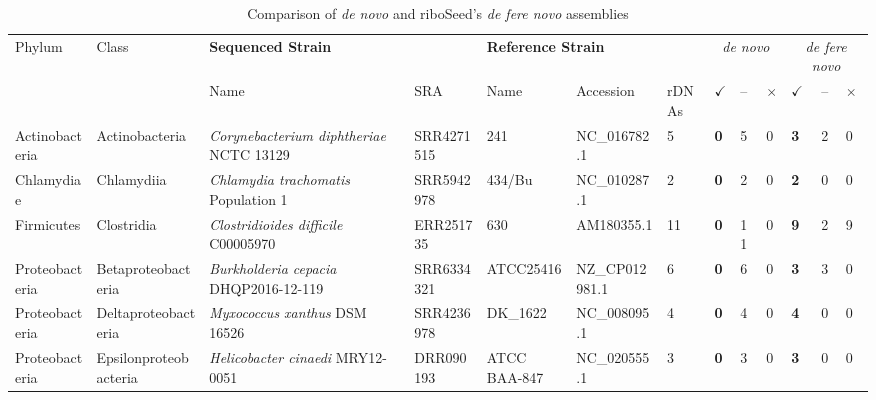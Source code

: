 \begin{sidewaystable}[!hb]
  \centering
  \caption{Comparison of \textit{de novo} and riboSeed's \textit{de fere novo} assemblies}
  \label{table:phyla}
  \begin{tabular}{p{2.25cm}p{2.65cm}p{5.75cm}p{1.75cm}p{2.25cm}p{1.95cm}p{.6cm}>{\hfill}p{.4cm}p{.2cm}p{.1cm}>{\hfill}p{.4cm}p{.2cm}p{.1cm}}
    \toprule
    \multirow{2}{*}{Phylum} & \multirow{2}{*}{Class}  & \multicolumn{2}{l}{\textbf{Sequenced Strain}}  &  \multicolumn{3}{l}{\textbf{Reference Strain}} &  \multicolumn{3}{c}{\textit{de novo}} & \multicolumn{3}{c}{\textit{de fere novo}} \\
    & & Name & SRA & Name & Accession & rDNAs & \textbf{$\checkmark$} & -- & $\times$ & \textbf{$\checkmark$} & -- & $\times$  \\
    \toprule
    Actinobacteria & Actinobacteria        & \textit{Corynebacterium  diphtheriae}   NCTC 13129      & SRR4271515 & 241 &  NC\_016782.1      & 5  & \textbf{0} & 5  & 0 & \textbf{3} & 2 & 0 \\
    Chlamydiae     & Chlamydiia            & \textit{Chlamydia        trachomatis}  Population 1 & SRR5942978 & 434/Bu & NC\_010287.1     & 2  & \textbf{0} & 2  & 0 & \textbf{2} & 0 & 0 \\
    Firmicutes     & Clostridia            & \textit{Clostridioides   difficile}    C00005970                                             & ERR251735  & 630  &AM180355.1       & 11 & \textbf{0} & 11 & 0 & \textbf{9} & 2 & 9 \\
    Proteobacteria & Betaproteobacteria    & \textit{Burkholderia     cepacia}      DHQP2016-12-119                                       & SRR6334321 & ATCC25416       & NZ\_CP012981.1    & 6  & \textbf{0} & 6  & 0 & \textbf{3} & 3 & 0 \\
    Proteobacteria & Deltaproteobacteria   & \textit{Myxococcus       xanthus}      DSM 16526                                             & SRR4236978 & DK\_1622 & NC\_008095.1
  & 4  & \textbf{0} & 4  & 0 & \textbf{4} & 0 & 0 \\
    Proteobacteria & Epsilonproteobacteria & \textit{Helicobacter     cinaedi}      MRY12-0051                                            & DRR090193  & ATCC BAA-847 & NC\_020555.1 & 3  & \textbf{0} & 3  & 0 & \textbf{3} & 0 & 0 \\

\end{tabular}
\end{sidewaystable}
